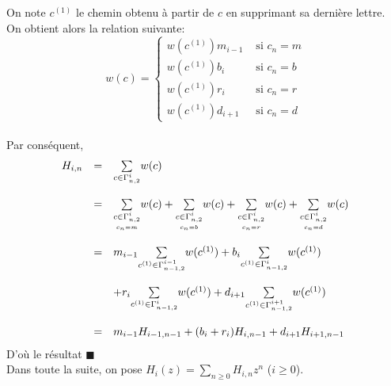On note $c^{(1)}$ le chemin obtenu à partir de $c$ en
supprimant sa dernière lettre. \\
On obtient alors la relation suivante:
$$
	w(c) = \begin{cases}
		w(c^{(1)})m_{i-1} & \text{ si }c_{n}=m \\
		w(c^{(1)})b_{i}   & \text{ si }c_{n}=b \\
		w(c^{(1)})r_{i}   & \text{ si }c_{n}=r \\
		w(c^{(1)})d_{i+1} & \text{ si }c_{n}=d
	\end{cases}
$$\vspace{5pt}\\
Par conséquent,
\[
	\begin{array}{r c l}
		H_{i,n} & =       & \underset{c \in \Gamma_{n,2}^{i}}{\sum}w(c)                                              \\
		        & \text{} &                                                                                          \\
		        & =       & \underset{\scriptstyle\underset{c_{n}=m}{ c \in \Gamma_{n,2}^{i}}}{\sum}w(c)+
		\underset{\scriptstyle \underset{c_{n}=b}{c\in \Gamma_{n,2}^{i}}}{\sum}w(c)+
		\underset{\scriptstyle \underset{c_{n}=r}{c\in \Gamma_{n,2}^{i}}}{\sum}w(c)+
		\underset{\scriptstyle \underset{c_{n}=d}{c\in \Gamma_{n,2}^{i}}}{\sum}w(c)                                  \\
		        & \text{} &                                                                                          \\
		        & =       & m_{i-1}\underset{c^{(1)}\in \Gamma_{n-1,2}^{i-1}}{\sum}w(c^{(1)})+b_{i}\underset{c^{(1)}
			\in \Gamma_{n-1,2}^{i}}{\sum}w(c^{(1)})                              \\
				& \text{} & \\
		        & \text{} & +r_{i}\underset{c^{(1)}\in \Gamma_{n-1,2}^{i}}{\sum}w(c^{(1)})+d_{i+1}\underset{c^{(1)} \in \Gamma_{n-1,2}^{i+1}}{\sum}w(c^{(1)})                                                                                            \\
				& \text{} &\\
		        & =       & m_{i-1}H_{i-1,n-1}+(b_{i}+r_{i})H_{i,n-1}+d_{i+1}H_{i+1,n-1}\hspace{5pt}
	\end{array}
\]D'où le résultat $\blacksquare$\vspace{15pt}\\
Dans toute la suite, on pose $H_{i}(z) = \underset{n\geq 0}{\sum}H_{i, n}z^{n}$ ($i\geq 0$).
